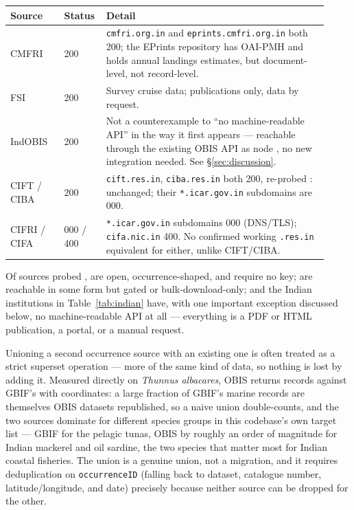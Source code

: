 \begin{wtable}
\centering
\tabscale
\caption{Tier 3: Indian marine research institutions, no machine-readable
API (one important exception). All probed \ProbeDate{} unless a re-probe
date is noted; \NTableRowsIndian{} rows cover \NTierThree{} sources.}
\label{tab:indian}
\begin{tabular}{p{0.16\linewidth}p{0.10\linewidth}p{0.66\linewidth}}
\toprule
Source & Status & Detail \\
\midrule
CMFRI & 200 & \texttt{cmfri.org.in} and \texttt{eprints.cmfri.org.in} both 200; the EPrints repository has OAI-PMH and holds annual landings estimates, but document-level, not record-level. \\
FSI & 200 & Survey cruise data; publications only, data by request. \\
IndOBIS & 200 & Not a counterexample to ``no machine-readable API'' in the way it first appears --- reachable through the existing OBIS API as node \texttt{\IndObisNodeId{}}, no new integration needed. See \S\ref{sec:discussion}. \\
CIFT / CIBA & 200 & \texttt{cift.res.in}, \texttt{ciba.res.in} both 200, re-probed \AsOf{}: unchanged; their \texttt{*.icar.gov.in} subdomains are 000. \\
CIFRI / CIFA & 000 / 400 & \texttt{*.icar.gov.in} subdomains 000 (DNS/TLS); \texttt{cifa.nic.in} 400. No confirmed working \texttt{.res.in} equivalent for either, unlike CIFT/CIBA. \\
\bottomrule
\end{tabular}
\end{wtable}

Of \NSourcesSurveyed{} sources probed \ProbeDate{}, \NTierOne{} are open,
occurrence-shaped, and require no key; \NTierTwo{} are reachable in some form
but gated or bulk-download-only; and the \NTierThree{} Indian institutions in
Table~\ref{tab:indian} have, with one important exception discussed below,
no machine-readable API at all --- everything is a PDF or HTML publication,
a portal, or a manual request.

Unioning a second occurrence source with an existing one is often treated as
a strict superset operation --- more of the same kind of data, so nothing is
lost by adding it. Measured directly on \emph{Thunnus albacares}, OBIS
returns \ObisTunaRecords{} records against GBIF's \GbifTunaRecords{} with
coordinates: a large fraction of GBIF's marine records are themselves OBIS
datasets republished, so a naive union double-counts, and the two sources
dominate for different species groups in this codebase's own target list ---
GBIF for the pelagic tunas, OBIS by roughly an order of magnitude for Indian
mackerel and oil sardine, the two species that matter most for Indian
coastal fisheries. The union is a genuine union, not a migration, and it
requires deduplication on \texttt{occurrenceID} (falling back to dataset,
catalogue number, latitude/longitude, and date) precisely because neither
source can be dropped for the other.


